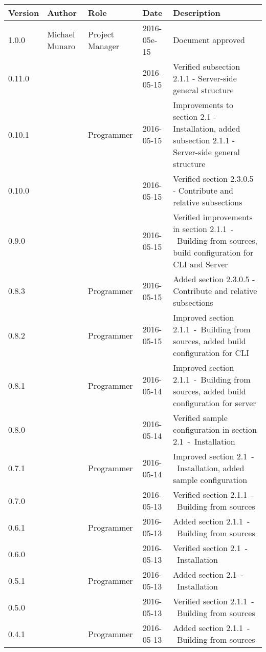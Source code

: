 \documentclass{scalatekids-article}
\begin{document}
\begin{center}
  \begin{longtable}{| l | l | l | l | p{5cm} |}
    \hline
    Version & Author & Role & Date & Description \\
    \hline
    1.0.0 & Michael Munaro & Project Manager & 2016-05e-15 & Document approved\\
    \hline
    0.11.0 & & & 2016-05-15 & Verified subsection 2.1.1 - Server-side general structure\\
    \hline
    0.10.1 & & Programmer & 2016-05-15 & Improvements to section 2.1 - Installation, added subsection 2.1.1 - Server-side general structure\\
    \hline
    0.10.0 & & & 2016-05-15 & Verified section 2.3.0.5 - Contribute and relative subsections\\
    \hline
    0.9.0 & & & 2016-05-15 & Verified improvements in section 2.1.1\ -\ Building from sources, build configuration for CLI and Server\\
    \hline
    0.8.3 & & Programmer & 2016-05-15 & Added section 2.3.0.5 - Contribute and relative subsections \\
    \hline
    0.8.2 & & Programmer & 2016-05-15 & Improved section 2.1.1\ -\ Building from sources, added build configuration for CLI\\
    \hline
    0.8.1 & & Programmer & 2016-05-14 & Improved section 2.1.1\ -\ Building from sources, added build configuration for server\\
    \hline
    0.8.0 & & & 2016-05-14 & Verified sample configuration in section 2.1\ -\ Installation\\
    \hline
    0.7.1 & & Programmer & 2016-05-14 & Improved section 2.1\ -\ Installation, added sample configuration\\
    \hline
    0.7.0 & & & 2016-05-13 & Verified section 2.1.1\ -\ Building from sources\\
    \hline
    0.6.1 & & Programmer & 2016-05-13 & Added section 2.1.1\ -\ Building from sources\\
    \hline
    0.6.0 & & & 2016-05-13 & Verified section 2.1\ -\ Installation\\
    \hline
    0.5.1 & & Programmer & 2016-05-13 & Added section 2.1\ -\ Installation\\
    \hline
    0.5.0 & & & 2016-05-13 & Verified section 2.1.1\ -\ Building from sources\\
    \hline
    0.4.1 & & Programmer & 2016-05-13 & Added section 2.1.1\ -\ Building from sources\\

\end{longtable}
\end{center}
\end{document}
